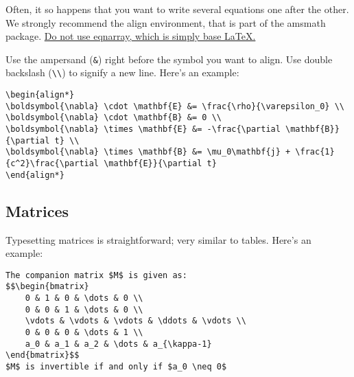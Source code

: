 \documentclass[12pt, letterpaper]{article}
\theoremstyle{remark}
\begin{document}
Often, it so happens that you want to write several equations one after the other. We strongly recommend the align environment, that is part of the amsmath package. \href{https://tex.stackexchange.com/questions/196/eqnarray-vs-align}{Do not use eqnarray, which is simply base \LaTeX.} \cite{eqnarray} 

Use the ampersand (\verb!&!) right before the symbol you want to align. Use double backslash (\verb!\\!) to signify a new line. Here's an example:  

\begin{lstlisting}
\begin{align*}
\boldsymbol{\nabla} \cdot \mathbf{E} &= \frac{\rho}{\varepsilon_0} \\
\boldsymbol{\nabla} \cdot \mathbf{B} &= 0 \\
\boldsymbol{\nabla} \times \mathbf{E} &= -\frac{\partial \mathbf{B}}{\partial t} \\
\boldsymbol{\nabla} \times \mathbf{B} &= \mu_0\mathbf{j} + \frac{1}{c^2}\frac{\partial \mathbf{E}}{\partial t}
\end{align*}
\end{lstlisting}


\subsection{Matrices}
Typesetting matrices is straightforward; very similar to tables. Here's an example:
\begin{lstlisting}
The companion matrix $M$ is given as:
$$\begin{bmatrix}
	0 & 1 & 0 & \dots & 0 \\
	0 & 0 & 1 & \dots & 0 \\
	\vdots & \vdots & \vdots & \ddots & \vdots \\
	0 & 0 & 0 & \dots & 1 \\
	a_0 & a_1 & a_2 & \dots & a_{\kappa-1} 
\end{bmatrix}$$
$M$ is invertible if and only if $a_0 \neq 0$
\end{lstlisting}
\end{document}
